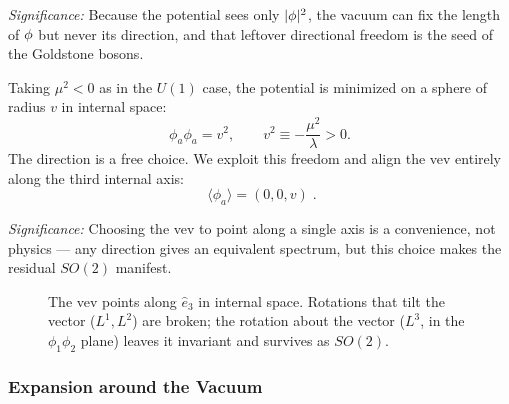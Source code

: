\textit{Significance:} Because the potential sees only $|\mathbf{\phi}|^2$, the vacuum can fix the length of $\mathbf{\phi}$ but never its direction, and that leftover directional freedom is the seed of the Goldstone bosons.

Taking $\mu^2<0$ as in the $U(1)$ case, the potential is minimized on a sphere of radius $v$ in internal space:
\begin{equation}
  \phi_a\phi_a=v^2,
  \qquad
  v^2\equiv-\frac{\mu^2}{\lambda}>0 .
  \label{eq:lec16:so3_vev_magnitude}
\end{equation}
The direction is a free choice. We exploit this freedom and align the vev entirely along the third internal axis:
\begin{equation}
  \boxed{\;\langle\phi_a\rangle=(0,0,v)\; .}
  \label{eq:lec16:so3_chosen_vacuum}
\end{equation}

\textit{Significance:} Choosing the vev to point along a single axis is a convenience, not physics --- any direction gives an equivalent spectrum, but this choice makes the residual $SO(2)$ manifest.

\begin{figure}[ht]
\centering
{}
\caption{The vev points along $\hat e_3$ in internal space. Rotations that tilt the vector ($L^1,L^2$) are broken; the rotation about the vector ($L^3$, in the $\phi_1\phi_2$ plane) leaves it invariant and survives as $SO(2)$.}
\label{fig:lec16:so3-vev-sphere}
\end{figure}

\subsubsection*{Expansion around the Vacuum}

